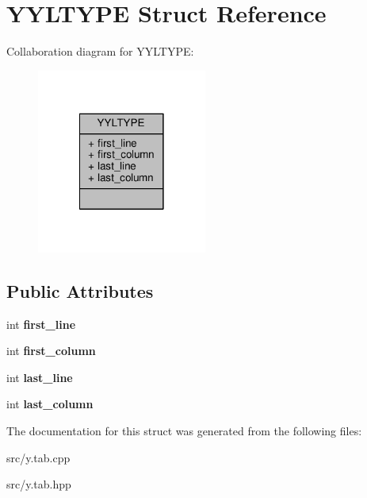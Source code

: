 \hypertarget{struct_y_y_l_t_y_p_e}{\section{Y\-Y\-L\-T\-Y\-P\-E Struct Reference}
\label{struct_y_y_l_t_y_p_e}
}


Collaboration diagram for Y\-Y\-L\-T\-Y\-P\-E\-:
\nopagebreak
\begin{figure}[H]
\begin{center}
\leavevmode
\includegraphics[width=158pt]{struct_y_y_l_t_y_p_e__coll__graph}
\end{center}
\end{figure}
\subsection*{Public Attributes}
\begin{DoxyCompactItemize}
\item 
\hypertarget{struct_y_y_l_t_y_p_e_a50ad3435eaea74bcab6f1ae5fbaefd89}{int {\bfseries first\-\_\-line}}\label{struct_y_y_l_t_y_p_e_a50ad3435eaea74bcab6f1ae5fbaefd89}

\item 
\hypertarget{struct_y_y_l_t_y_p_e_a3a556533babab1b9066fa9bdbb809210}{int {\bfseries first\-\_\-column}}\label{struct_y_y_l_t_y_p_e_a3a556533babab1b9066fa9bdbb809210}

\item 
\hypertarget{struct_y_y_l_t_y_p_e_a3075f2bc3448df5d2a9f16d22bff2cc1}{int {\bfseries last\-\_\-line}}\label{struct_y_y_l_t_y_p_e_a3075f2bc3448df5d2a9f16d22bff2cc1}

\item 
\hypertarget{struct_y_y_l_t_y_p_e_acf87f8c98686f286eaf700c4b62157b2}{int {\bfseries last\-\_\-column}}\label{struct_y_y_l_t_y_p_e_acf87f8c98686f286eaf700c4b62157b2}

\end{DoxyCompactItemize}


The documentation for this struct was generated from the following files\-:\begin{DoxyCompactItemize}
\item 
src/y.\-tab.\-cpp\item 
src/y.\-tab.\-hpp\end{DoxyCompactItemize}
